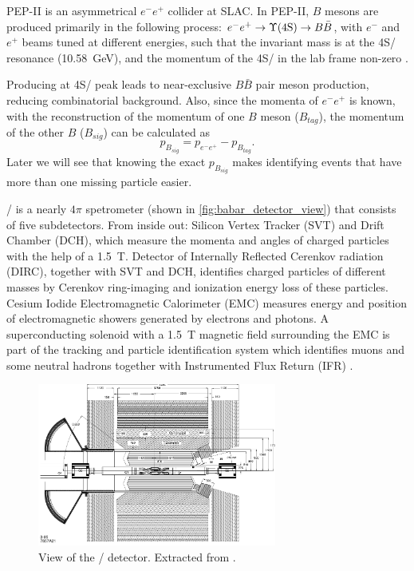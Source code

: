 PEP-II is an asymmetrical $e^- e^+$ collider at SLAC.
In PEP-II, $B$ mesons are produced primarily in the following process:
$e^- e^+ \rightarrow \Y4S/ \rightarrow B \bar{B}$, with
$e^-$ and $e^+$ beams tuned at different energies,
such that the invariant mass is at the \Y4S/ resonance (\SI{10.58}{GeV}),
and the momentum of the \Y4S/ in the lab frame
non-zero \cite{Harrison:1998yr}.

Producing at \Y4S/ peak leads to near-exclusive $B \bar{B}$ pair meson
production, reducing combinatorial background.
Also, since the momenta of $e^- e^+$ is known, with the reconstruction of the
momentum of one $B$ meson ($B_{tag}$), the momentum of the other $B$
($B_{sig}$) can be calculated as
\begin{equation}
    p_{B_{sig}} = p_{e^-e^+} - p_{B_{tag}}.
\end{equation}
Later we will see that knowing the exact $p_{B_{sig}}$ makes identifying events
that have more than one missing particle easier.

\BaBar/ is a nearly $4\pi$ spetrometer (shown in
\autoref{fig:babar_detector_view}) that consists of five subdetectors.
From inside out:
Silicon Vertex Tracker (SVT) and Drift Chamber (DCH), which measure the momenta
and angles of charged particles with the help of a \SI{1.5}{T}.
Detector of Internally Reflected Cerenkov radiation (DIRC), together with SVT
and DCH, identifies charged particles of different masses by Cerenkov
ring-imaging and ionization energy loss of these particles.
Cesium Iodide Electromagnetic Calorimeter (EMC) measures energy and
position of electromagnetic showers generated by electrons and photons.
A superconducting solenoid with a \SI{1.5}{T} magnetic field surrounding the
EMC is part of the tracking and particle identification system which identifies
muons and some neutral hadrons together with Instrumented Flux Return
(IFR) \cite{Lees:2013uzd}.

\begin{figure}[ht]
    \centering
    \includegraphics[width=0.7\textwidth]{figs/babar_detector_view.pdf}
    \caption{
        View of the \BaBar/ detector.
        Extracted from \cite{Boutigny:1995ib}.
    }
    \label{fig:babar_detector_view}
\end{figure}

